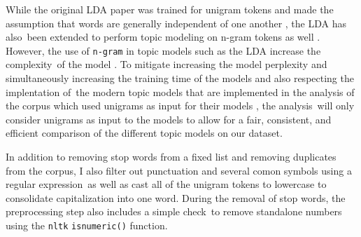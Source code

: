 \documentclass[letterpaper,12pt]{article}
\begin{document}
While the original LDA paper was trained for unigram tokens and made the assumption that words are generally independent of one another \cite{blei2003latent}, the LDA has also\
been extended to perform topic modeling on n-gram tokens as well \cite{wang2005note}. However, the use of \texttt{n-gram} in topic models such as the LDA increase the complexity\
of the model \cite{wang2007topical}. To mitigate increasing the model perplexity and simultaneously increasing the training time of the models and also respecting the implentation of\
the modern topic models that are implemented in the analysis of the corpus which used unigrams as input for their models \cite{moody2016mixing}\cite{dieng2019topic}, the analysis\
will only consider unigrams as input to the models to allow for a fair, consistent, and efficient comparison of the different topic models on our dataset.

In addition to removing stop words from a fixed list and removing duplicates from the corpus, I also filter out punctuation and several comon symbols using a regular expression\
as well as cast all of the unigram tokens to lowercase to consolidate capitalization into one word. During the removal of stop words, the preprocessing step also includes a simple check\
to remove standalone numbers using the \texttt{nltk} \cite{loper2002nltk} \texttt{isnumeric()} function.
\end{document}
